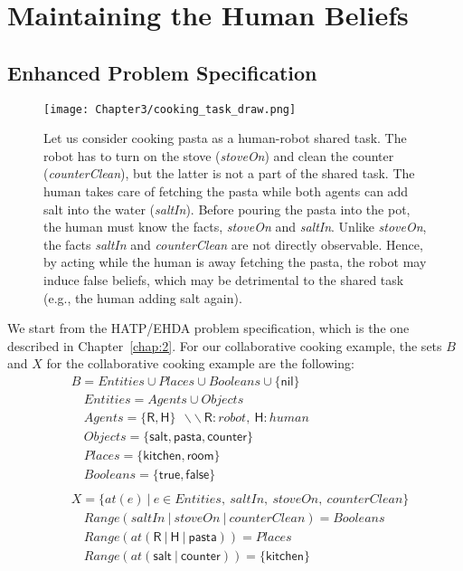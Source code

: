 \section{Maintaining the Human Beliefs}

    \subsection{Enhanced Problem Specification}

\begin{figure}
    \centering
    \texttt{[image: Chapter3/cooking\_task\_draw.png]}
    \caption{
    Let us consider cooking pasta as a human-robot shared task. 
    The robot has to turn on the stove (\textit{stoveOn}) and clean the counter (\textit{counterClean}), but the latter is not a part of the shared task. The human takes care of fetching the pasta while both agents can add salt into the water (\textit{saltIn}). Before pouring the pasta into the pot, the human must know the facts, \textit{stoveOn} and \textit{saltIn}. 
    Unlike \textit{stoveOn}, the facts \textit{saltIn} and \textit{counterClean} are not directly observable. 
    Hence, by acting while the human is away fetching the pasta, the robot may induce false beliefs, which may be detrimental to the shared task (e.g., the human adding salt again).
    }
    \label{fig:new_scene}
\end{figure}

We start from the HATP/EHDA problem specification, which is the one described in Chapter~\ref{chap:2}. For our collaborative cooking example, the sets $B$ and $X$ for the collaborative cooking example are the following:
{\small
\begin{align*}
&B           = Entities \cup Places \cup Booleans \cup \{\textsf{nil}\} \\
&\quad Entities    = Agents \cup Objects\\
&\quad Agents      = \{ \textsf{R}, \textsf{H} \} ~~ \backslash\backslash~\textsf{R}:robot,~\textsf{H}:human\\
&\quad Objects     = \{ \textsf{salt}, \textsf{pasta}, \textsf{counter} \}\\
&\quad Places      = \{ \textsf{kitchen}, \textsf{room} \}\\
&\quad Booleans    = \{ \textsf{true},\textsf{false} \}\\
&\\
&X = \{ at(e)~|~ e \in Entities, ~saltIn, ~stoveOn, ~counterClean  \}\\
&\quad \textit{Range}(saltIn ~|~ stoveOn ~|~ counterClean)=Booleans\\
&\quad \textit{Range}(at(\textsf{R} ~|~ \textsf{H} ~|~ \textsf{pasta})) = Places\\
&\quad \textit{Range}(at(\textsf{salt} ~|~ \textsf{counter})) = \{ \textsf{kitchen} \}
\end{align*}
}

